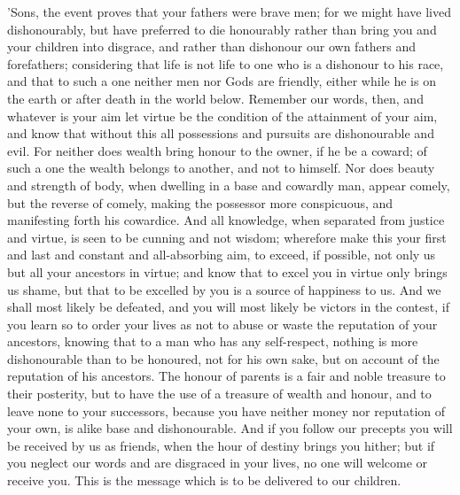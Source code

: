 \documentclass[11pt,letter]{article}
\begin{document}
\par  'Sons, the event proves that your fathers were brave men; for we might have lived dishonourably, but have preferred to die honourably rather than bring you and your children into disgrace, and rather than dishonour our own fathers and forefathers; considering that life is not life to one who is a dishonour to his race, and that to such a one neither men nor Gods are friendly, either while he is on the earth or after death in the world below. Remember our words, then, and whatever is your aim let virtue be the condition of the attainment of your aim, and know that without this all possessions and pursuits are dishonourable and evil. For neither does wealth bring honour to the owner, if he be a coward; of such a one the wealth belongs to another, and not to himself. Nor does beauty and strength of body, when dwelling in a base and cowardly man, appear comely, but the reverse of comely, making the possessor more conspicuous, and manifesting forth his cowardice. And all knowledge, when separated from justice and virtue, is seen to be cunning and not wisdom; wherefore make this your first and last and constant and all-absorbing aim, to exceed, if possible, not only us but all your ancestors in virtue; and know that to excel you in virtue only brings us shame, but that to be excelled by you is a source of happiness to us. And we shall most likely be defeated, and you will most likely be victors in the contest, if you learn so to order your lives as not to abuse or waste the reputation of your ancestors, knowing that to a man who has any self-respect, nothing is more dishonourable than to be honoured, not for his own sake, but on account of the reputation of his ancestors. The honour of parents is a fair and noble treasure to their posterity, but to have the use of a treasure of wealth and honour, and to leave none to your successors, because you have neither money nor reputation of your own, is alike base and dishonourable. And if you follow our precepts you will be received by us as friends, when the hour of destiny brings you hither; but if you neglect our words and are disgraced in your lives, no one will welcome or receive you. This is the message which is to be delivered to our children.
\end{document}
